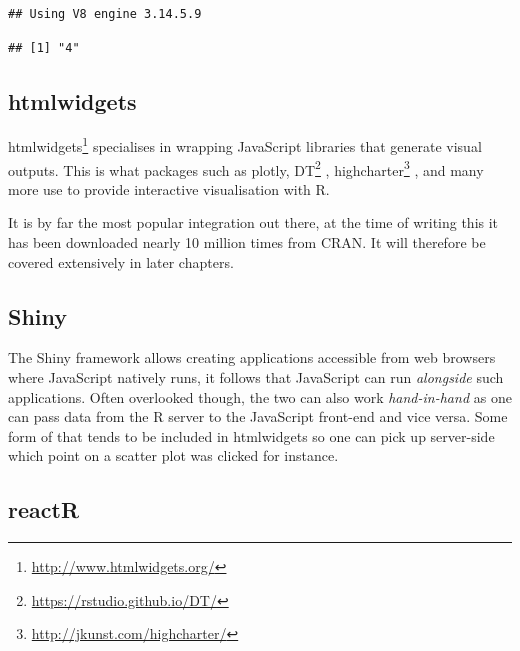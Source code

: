 \documentclass[
]{krantz}
\makeatletter
\newenvironment{Shaded}{\begin{snugshade}}{\end{snugshade}}
\newcommand{\CommentTok}[1]{\textcolor[rgb]{0.37,0.37,0.37}{\textit{#1}}}
\newcommand{\KeywordTok}[1]{\textcolor[rgb]{0.27,0.27,0.27}{\textbf{#1}}}
\newcommand{\NormalTok}[1]{#1}
\newcommand{\OperatorTok}[1]{\textcolor[rgb]{0.43,0.43,0.43}{\textbf{#1}}}
\newcommand{\StringTok}[1]{\textcolor[rgb]{0.5,0.5,0.5}{#1}}
\renewcommand{\href}[2]{#2\footnote{\url{#1}}}
\newenvironment{kframe}{%
\medskip{}
\setlength{\fboxsep}{.8em}
 \def\at@end@of@kframe{}%
 \ifinner\ifhmode%
  \def\at@end@of@kframe{\end{minipage}}%
  \begin{minipage}{\columnwidth}%
 \fi\fi%
 \def\FrameCommand##1{\hskip\@totalleftmargin \hskip-\fboxsep
 \colorbox{shadecolor}{##1}\hskip-\fboxsep
     \hskip-\linewidth \hskip-\@totalleftmargin \hskip\columnwidth}%
 \MakeFramed {\advance\hsize-\width
   \@totalleftmargin\z@ \linewidth\hsize
   \@setminipage}}%
 {\par\unskip\endMakeFramed%
 \at@end@of@kframe}
\renewenvironment{Shaded}{\begin{kframe}}{\end{kframe}}
\makeatother
\begin{document}
\begin{verbatim}
## Using V8 engine 3.14.5.9
\end{verbatim}

\begin{Shaded}
\end{Shaded}

\begin{verbatim}
## [1] "4"
\end{verbatim}

\hypertarget{htmlwidgets}{%
\subsection*{htmlwidgets}\label{htmlwidgets}}


\href{http://www.htmlwidgets.org/}{htmlwidgets} \citep{R-htmlwidgets} specialises in wrapping JavaScript libraries that generate visual outputs. This is what packages such as plotly, \href{https://rstudio.github.io/DT/}{DT} \citep{R-DT}, \href{http://jkunst.com/highcharter/}{highcharter} \citep{R-highcharter}, and many more use to provide interactive visualisation with R.

It is by far the most popular integration out there, at the time of writing this it has been downloaded nearly 10 million times from CRAN. It will therefore be covered extensively in later chapters.

\hypertarget{shiny}{%
\subsection*{Shiny}\label{shiny}}


The Shiny framework allows creating applications accessible from web browsers where JavaScript natively runs, it follows that JavaScript can run \emph{alongside} such applications. Often overlooked though, the two can also work \emph{hand-in-hand} as one can pass data from the R server to the JavaScript front-end and vice versa. Some form of that tends to be included in htmlwidgets so one can pick up server-side which point on a scatter plot was clicked for instance.

\hypertarget{reactr}{%
\subsection*{reactR}\label{reactr}}
\end{document}
